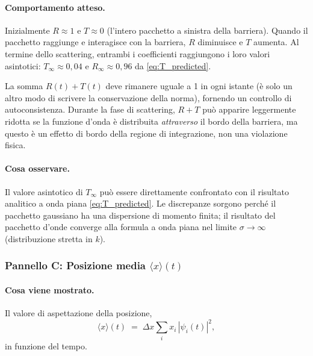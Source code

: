 \documentclass[12pt, a4paper]{article}
\newcommand{\dx}{\Delta x}
\begin{document}
\paragraph{Comportamento atteso.}
Inizialmente $R \approx 1$ e $T \approx 0$ (l'intero pacchetto a sinistra
della barriera). Quando il pacchetto raggiunge e interagisce con la barriera,
$R$ diminuisce e $T$ aumenta. Al termine dello scattering, entrambi i
coefficienti raggiungono i loro valori asintotici: $T_\infty \approx 0{,}04$
e $R_\infty \approx 0{,}96$ da \eqref{eq:T_predicted}.

La somma $R(t) + T(t)$ deve rimanere uguale a 1 in ogni istante (è solo
un altro modo di scrivere la conservazione della norma), fornendo un
controllo di autoconsistenza. Durante la fase di scattering, $R+T$ può
apparire leggermente ridotta se la funzione d'onda è distribuita
\emph{attraverso} il bordo della barriera, ma questo è un effetto di
bordo della regione di integrazione, non una violazione fisica.

\paragraph{Cosa osservare.}
Il valore asintotico di $T_\infty$ può essere direttamente confrontato
con il risultato analitico a onda piana \eqref{eq:T_predicted}. Le discrepanze
sorgono perché il pacchetto gaussiano ha una dispersione di momento finita;
il risultato del pacchetto d'onde converge alla formula a onda piana nel
limite $\sigma \to \infty$ (distribuzione stretta in $k$).

\subsubsection{Pannello C: Posizione media $\langle x \rangle(t)$}

\paragraph{Cosa viene mostrato.}
Il valore di aspettazione della posizione,
\begin{equation}
  \langle x\rangle(t) \;=\; \dx\sum_i x_i\,|\psi_i(t)|^2,
\end{equation}
in funzione del tempo.
\end{document}
